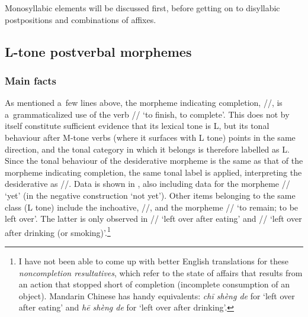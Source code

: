 Monosyllabic elements will be discussed first, before getting on to disyllabic postpositions and combinations of affixes.

\subsection[L tone]{L-tone postverbal morphemes}
\label{sec:ltonesuffixesandserializedverbs}

\subsubsection{Main facts}
\label{sec:mainfactsaboutlsuffix}

\largerpage[-2]
As mentioned a~few lines above, the morpheme indicating completion, \mbox{//}, is a~grammaticalized use of the verb // ‘to finish, to complete'. This does not by itself constitute sufficient evidence that its lexical tone is L, but its tonal behaviour after M-tone verbs (where it surfaces with L tone) points in the same direction, and the tonal category in which it belongs is therefore labelled as L. Since the tonal behaviour of the {desiderative} morpheme is the same as that of the morpheme indicating completion, the same tonal label is applied, interpreting the {desiderative} as \mbox{//}. Data is shown in , also including data for the morpheme // ‘yet’ (in the negative construction ‘not yet’). Other items belonging to the same class (L tone) include the {inchoative}, //, and the morpheme // ‘to remain; to be left over’. The latter is only observed in // ‘left over after eating’ and // ‘left over after drinking (or smoking)’.\footnote{I have not been able to come up with better {English} translations for these \textit{noncompletion resultatives}, which refer to the state of affairs that results from an action that stopped short of completion (incomplete consumption of an object). {Mandarin} Chinese has handy equivalents: \textit{chī shèng de}  for ‘left over after eating’ and \textit{hē shèng de}  for ‘left over after drinking’.}

